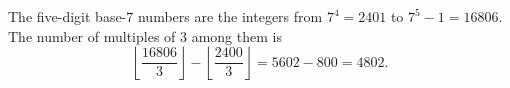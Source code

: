 The five-digit base-$7$ numbers are the integers from $7^4=2401$ to $7^5-1=16806$. The number of multiples of $3$ among them is
\[\left\lfloor\dfrac{16806}3\right\rfloor-\left\lfloor\dfrac{2400}3\right\rfloor=5602-800=\boxed{4802}.\]
